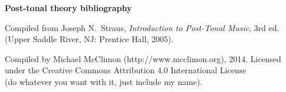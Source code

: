 \documentclass[12pt]{article}
\begin{document}
\raggedright

{\bfseries\large Post-tonal theory bibliography}

\medskip

{ \small Compiled from Joseph N.~Straus, \emph{Introduction to Post-Tonal
Music}, 3rd ed. (Upper Saddle River, NJ: Prentice Hall, 2005). }

\nocite{*}
\printbibliography[heading=none]

\vspace*{\fill}
\begin{spacing}{0.75}
{ \scriptsize Compiled by Michael McClimon (http://www.mcclimon.org), 2014.
Licensed under the Creative Commons Attribution 4.0 International License \\
(do whatever you want with it, just include my name).}
\end{spacing}
\end{document}
